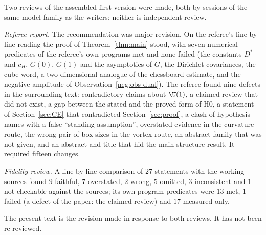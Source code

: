 Two reviews of the assembled first version were made, both by sessions of the same model family as the writers; neither is independent review.

\emph{Referee report.} The recommendation was major revision. On the referee's line-by-line reading the proof of Theorem~\ref{thm:main} stood, with seven numerical predicates of the referee's own programs met and none failed (the constants $D^*$ and $c_H$, $G(0)$, $G(1)$ and the asymptotics of $G$, the Dirichlet covariances, the cube word, a two-dimensional analogue of the chessboard estimate, and the negative amplitude of Observation~\ref{neg:obs-dual}). The referee found nine defects in the surrounding text: contradictory claims about $\U(1)$, a claimed review that did not exist, a gap between the stated and the proved form of H0, a statement of Section~\ref{sec:CE} that contradicted Section~\ref{sec:proof}, a clash of hypothesis names with a false ``standing assumption'', overstated evidence in the curvature route, the wrong pair of box sizes in the vortex route, an abstract family that was not given, and an abstract and title that hid the main structure result. It required fifteen changes.

\emph{Fidelity review.} A line-by-line comparison of $27$ statements with the working sources found $9$ faithful, $7$ overstated, $2$ wrong, $5$ omitted, $3$ inconsistent and $1$ not checkable against the sources; its own program predicates were $13$ met, $1$ failed (a defect of the paper: the claimed review) and $17$ measured only.

The present text is the revision made in response to both reviews. It has not been re-reviewed.
